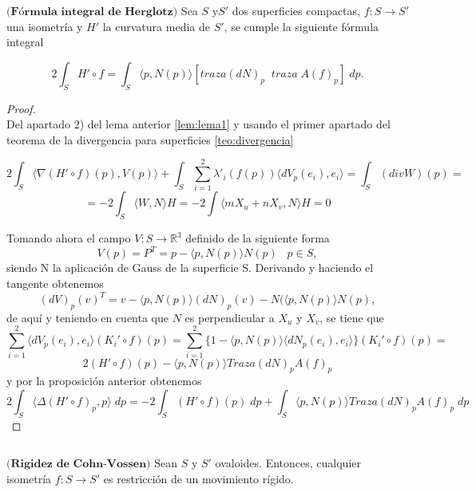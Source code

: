 \begin{teorema}\label{teo:herglotz}
	$\textbf{(Fórmula integral de Herglotz)}$ Sea $S$ y$S'$ dos superficies compactas, $f: S \to S'$ una isometría y $H'$ la curvatura media de $S'$, se cumple la siguiente fórmula integral
	
	\[
		2 \int_S H' \circ f = \int_S \langle p, N(p) \rangle [traza(dN)_p \;\; traza \; A(f)_p] \; dp.
	\]
	
\end{teorema}


\begin{proof}
	${ }$\\
	
Del apartado 2) del lema anterior  \ref{lem:lema1} y usando el primer apartado del teorema de la divergencia para superficies \ref{teo:divergencia}

\[
	2 \int_S \langle \nabla (H' \circ f)(p), V(p) \rangle + \int_S \sum_{i=1}^{2} \lambda'_{i}(f(p)) \langle dV_p(e_i), e_i \rangle = \int_S (div W)(p) = 
\]
\[
	= -2 \int_S \langle W, N \rangle H = -2 \int \langle mX_u + nX_v, N \rangle H = 0
\]

Tomando ahora el campo $V : S \to \mathbb{R}^3$ definido de la siguiente forma
\[
	V(p) = P^T = p - \langle p, N(p) \rangle N(p) \;\;\; p \in S,
\]
siendo N la aplicación de Gauss de la superficie S. Derivando y haciendo el tangente obtenemos
\[
	(dV)_p(v)^T = v - \langle p, N(p) \rangle (dN)_p(v) -N(\langle p, N(p) \rangle N(p),
\]
de aquí y teniendo en cuenta que $N$ es perpendicular a $X_u$ y $X_v$, se tiene que
\[
	\sum^{2}_{i=1} \langle dV_p (e_i), e_i \rangle (K_{i}' \circ f)(p) = \sum^{2}_{i=1} \{ 1 - \langle p, N(p) \rangle \langle dN_p(e_i), e_i \rangle \} (K_{i}' \circ f)(p) = 
\]
\[
	2 (H' \circ f)(p) - \langle p, N(p) \rangle Traza (dN)_p A(f)_p
\]
y por la proposición anterior obtenemos
\[
	2 \int_S \langle \Delta (H' \circ f)_p, p \rangle \; dp = -2 \int_S (H' \circ f)(p) \; dp + \int_S \langle p, N(p) \rangle Traza (dN)_p A(f)_p \; dp
\]
\end{proof}
${ }$\\






\begin{teorema}
	$\textbf{(Rigidez de Cohn-Vossen)}$ Sean $S$ y $S'$ ovaloides. Entonces, cualquier isometría $f : S \to S'$ es restricción de un movimiento rígido.
\end{teorema}

